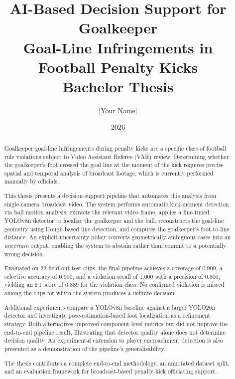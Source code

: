 \documentclass[12pt,a4paper,twoside]{article}
\title{
  \vspace{-1cm}
  \Large\textbf{AI-Based Decision Support for Goalkeeper\\
  Goal-Line Infringements in Football Penalty Kicks}\\[0.5cm]
  \large Bachelor Thesis
}
\author{[Your Name]}
\date{2026}
\begin{document}
\maketitle
\thispagestyle{empty}

\begin{abstract}
Goalkeeper goal-line infringements during penalty kicks are a specific class of
football rule violations subject to Video Assistant Referee (VAR) review.
Determining whether the goalkeeper's foot crossed the goal line at the moment of
the kick requires precise spatial and temporal analysis of broadcast footage,
which is currently performed manually by officials.

This thesis presents a decision-support pipeline that automates this analysis
from single-camera broadcast video.
The system performs automatic kick-moment detection via ball motion analysis,
extracts the relevant video frame, applies a fine-tuned YOLOv8n detector to
localize the goalkeeper and the ball, reconstructs the goal-line geometry using
Hough-based line detection, and computes the goalkeeper's foot-to-line distance.
An explicit uncertainty policy converts geometrically ambiguous cases into an
\textit{uncertain} output, enabling the system to abstain rather than commit to
a potentially wrong decision.

Evaluated on 22 held-out test clips, the final pipeline achieves a coverage of
0.909, a selective accuracy of 0.900, and a violation recall of 1.000 with a
precision of 0.800, yielding an F1 score of 0.889 for the violation class.
No confirmed violation is missed among the clips for which the system
produces a definite decision.

Additional experiments compare a YOLOv8n baseline against a larger YOLO26n
detector and investigate pose-estimation-based foot localization as a refinement
strategy. Both alternatives improved component-level metrics but did not improve
the end-to-end pipeline result, illustrating that detector quality alone does not
determine decision quality. An experimental extension to player encroachment
detection is also presented as a demonstration of the pipeline's generalisability.

The thesis contributes a complete end-to-end methodology, an annotated dataset
split, and an evaluation framework for broadcast-based penalty-kick officiating
support.
\end{abstract}

\newpage
\tableofcontents
\newpage

\end{document}
